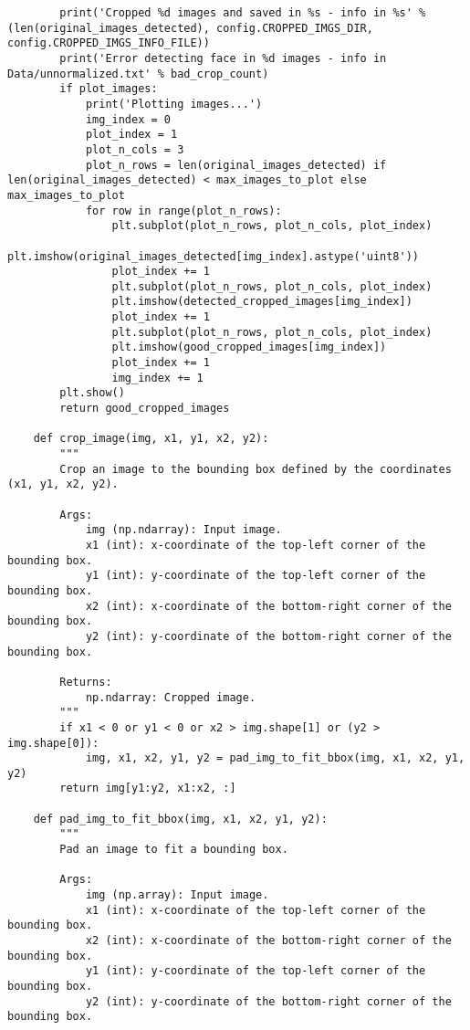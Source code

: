 \begin{verbatim}
        print('Cropped %d images and saved in %s - info in %s' % (len(original_images_detected), config.CROPPED_IMGS_DIR, config.CROPPED_IMGS_INFO_FILE))
        print('Error detecting face in %d images - info in Data/unnormalized.txt' % bad_crop_count)
        if plot_images:
            print('Plotting images...')
            img_index = 0
            plot_index = 1
            plot_n_cols = 3
            plot_n_rows = len(original_images_detected) if len(original_images_detected) < max_images_to_plot else max_images_to_plot
            for row in range(plot_n_rows):
                plt.subplot(plot_n_rows, plot_n_cols, plot_index)
                plt.imshow(original_images_detected[img_index].astype('uint8'))
                plot_index += 1
                plt.subplot(plot_n_rows, plot_n_cols, plot_index)
                plt.imshow(detected_cropped_images[img_index])
                plot_index += 1
                plt.subplot(plot_n_rows, plot_n_cols, plot_index)
                plt.imshow(good_cropped_images[img_index])
                plot_index += 1
                img_index += 1
        plt.show()
        return good_cropped_images
    
    def crop_image(img, x1, y1, x2, y2):
        """
        Crop an image to the bounding box defined by the coordinates (x1, y1, x2, y2).
    
        Args:
            img (np.ndarray): Input image.
            x1 (int): x-coordinate of the top-left corner of the bounding box.
            y1 (int): y-coordinate of the top-left corner of the bounding box.
            x2 (int): x-coordinate of the bottom-right corner of the bounding box.
            y2 (int): y-coordinate of the bottom-right corner of the bounding box.
        
        Returns:
            np.ndarray: Cropped image.    
        """
        if x1 < 0 or y1 < 0 or x2 > img.shape[1] or (y2 > img.shape[0]):
            img, x1, x2, y1, y2 = pad_img_to_fit_bbox(img, x1, x2, y1, y2)
        return img[y1:y2, x1:x2, :]
    
    def pad_img_to_fit_bbox(img, x1, x2, y1, y2):
        """
        Pad an image to fit a bounding box.
    
        Args:
            img (np.array): Input image.
            x1 (int): x-coordinate of the top-left corner of the bounding box.
            x2 (int): x-coordinate of the bottom-right corner of the bounding box.
            y1 (int): y-coordinate of the top-left corner of the bounding box.
            y2 (int): y-coordinate of the bottom-right corner of the bounding box.
        

\end{verbatim}
